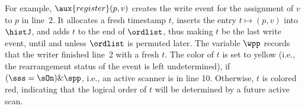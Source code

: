 %

For example, $\aux{register}(p, v)$ creates the write event for the
assignment of $v$ to $p$ in line~2. It allocates a fresh timestamp
$t$, inserts the entry $t \mapsto (p, v)$ into $\histJ$, and adds $t$
to the end of $\ordlist$, thus making $t$ be the last write event,
until and unless $\ordlist$ is permuted later. The variable $\wpp$
records that the writer finished line~2 with a fresh $t$. The color of
$t$ is set to yellow (i.e., the rearrangement status of the event is
left undetermined), if $(\sss= \sOn) \& \spp$, i.e., an active scanner
is in line 10. Otherwise, $t$ is colored red, indicating that the
logical order of $t$ will be determined by a future active scan.
%
%

